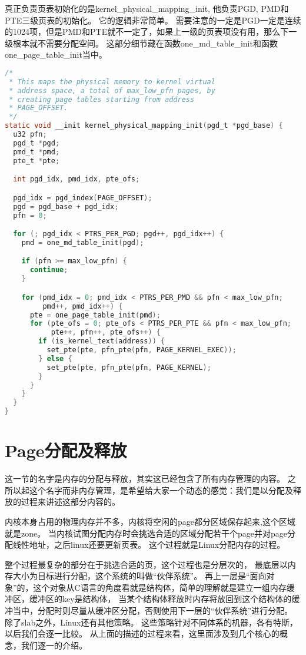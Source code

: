 真正负责页表初始化的是kernel\_physical\_mapping\_init, 他负责PGD, PMD和PTE三级页表的初始化。
它的逻辑非常简单。
需要注意的一定是PGD一定是连续的1024项，但是PMD和PTE就不一定了，如果上一级的页表项没有用，那么下一级根本就不需要分配空间。
这部分细节藏在函数one\_md\_table\_init和函数one\_page\_table\_init当中。
\begin{lstlisting}[language=C]
/*
 * This maps the physical memory to kernel virtual 
 * address space, a total of max_low_pfn pages, by 
 * creating page tables starting from address
 * PAGE_OFFSET.
 */
static void __init kernel_physical_mapping_init(pgd_t *pgd_base) {
  u32 pfn;
  pgd_t *pgd;
  pmd_t *pmd;
  pte_t *pte;

  int pgd_idx, pmd_idx, pte_ofs;

  pgd_idx = pgd_index(PAGE_OFFSET);
  pgd = pgd_base + pgd_idx;
  pfn = 0;

  for (; pgd_idx < PTRS_PER_PGD; pgd++, pgd_idx++) {
    pmd = one_md_table_init(pgd);

    if (pfn >= max_low_pfn) {
      continue;
    }

    for (pmd_idx = 0; pmd_idx < PTRS_PER_PMD && pfn < max_low_pfn;
         pmd++, pmd_idx++) {
      pte = one_page_table_init(pmd);
      for (pte_ofs = 0; pte_ofs < PTRS_PER_PTE && pfn < max_low_pfn;
           pte++, pfn++, pte_ofs++) {
        if (is_kernel_text(address)) {
          set_pte(pte, pfn_pte(pfn, PAGE_KERNEL_EXEC));
        } else {
          set_pte(pte, pfn_pte(pfn, PAGE_KERNEL);
        }
      }
    }
  }
}
\end{lstlisting}


\section{Page分配及释放}
 这一节的名字是内存的分配与释放，其实这已经包含了所有内存管理的内容。
之所以起这个名字而非内存管理，是希望给大家一个动态的感觉：我们是以分配及释放的过程来讲述这部分内容的。

内核本身占用的物理内存并不多，内核将空闲的page都分区域保存起来,这个区域就是zone。
当内核试图分配内存时会挑选合适的区域分配若干个page并对page分配线性地址，之后linux还要更新页表。
这个过程就是Linux分配内存的过程。


整个过程最复杂的部分在于挑选合适的页，这个过程也是分层次的， 最底层以内存大小为目标进行分配，这个系统的叫做“伙伴系统”。
再上一层是“面向对象”的，这个对象从C语言的角度看就是结构体，简单的理解就是建立一组内存缓冲区，缓冲区的key是结构体， 当某个结构体释放时内存将放回到这个结构体的缓冲当中，分配时则尽量从缓冲区分配，否则使用下一层的“伙伴系统”进行分配。
除了slab之外，Linux还有其他策略。
这些策略针对不同体系的机器，各有特斯，以后我们会逐一比较。
从上面的描述的过程来看，这里面涉及到几个核心的概念，我们逐一的介绍。

